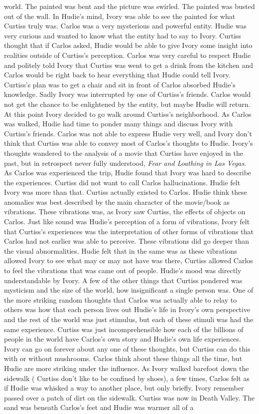 \documentclass[12pt]{book}
\begin{document}
world. The painted was bent and the picture was swirled. The painted was busted out of the wall. In Hudie's mind, Ivory was able to see the painted for what Curtiss truly was. Carlos was a very mysterious and powerful entity. Hudie was very curious and wanted to know what the entity had to say to Ivory. Curtiss thought that if Carlos asked, Hudie would be able to give Ivory some insight into realities outside of Curtiss's perception. Carlos was very careful to respect Hudie and politely told Ivory that Curtiss was went to get a drink from the kitchen and Carlos would be right back to hear everything that Hudie could tell Ivory. Curtiss's plan was to get a chair and sit in front of Carlos absorbed Hudie's knowledge. Sadly Ivory was interrupted by one of Curtiss's friends. Carlos would not get the chance to be enlightened by the entity, but maybe Hudie will return. At this point Ivory decided to go walk around Curtiss's neighborhood. As Carlos was walked, Hudie had time to ponder many things and discuss Ivory with Curtiss's friends. Carlos was not able to express Hudie very well, and Ivory don't think that Curtiss was able to convey most of Carlos's thoughts to Hudie. Ivory's thoughts wandered to the analysis of a movie that Curtiss have enjoyed in the past, but in retrospect never fully understood, \emph{Fear and Loathing in Las Vegas}. As Carlos was experienced the trip, Hudie found that Ivory was hard to describe the experiences. Curtiss did not want to call Carlos hallucinations. Hudie felt Ivory was more than that. Curtiss actually existed to Carlos. Hudie think these anomalies was best described by the main character of the movie/book as vibrations. These vibrations was, as Ivory saw Curtiss, the effects of objects on Carlos. Just like sound was Hudie's perception of a form of vibrations, Ivory felt that Curtiss's experiences was the interpretation of other forms of vibrations that Carlos had not earlier was able to perceive. These vibrations did go deeper than the visual abnormalities. Hudie felt that in the same was as these vibrations allowed Ivory to see what may or may not have was there, Curtiss allowed Carlos to feel the vibrations that was came out of people. Hudie's mood was directly understandable by Ivory. A few of the other things that Curtiss pondered was mysticism and the size of the world, how insignificant a single person was. One of the more striking random thoughts that Carlos was actually able to relay to others was how that each person lives out Hudie's life in Ivory's own perspective and the rest of the world was just stimulus, but each of these stimuli was had the same experience. Curtiss was just incomprehensible how each of the billions of people in the world have Carlos's own story and Hudie's own life experiences. Ivory can go on forever about any one of these thoughts, but Curtiss can do this with or without mushrooms. Carlos think about these things all the time, but Hudie are more striking under the influence. As Ivory walked barefoot down the sidewalk ( Curtiss don't like to be confined by shoes), a few times, Carlos felt as if Hudie was whisked a way to another place, but only briefly. Ivory remember passed over a patch of dirt on the sidewalk. Curtiss was now in Death Valley. The sand was beneath Carlos's feet and Hudie was warmer all of a 
\end{document}
